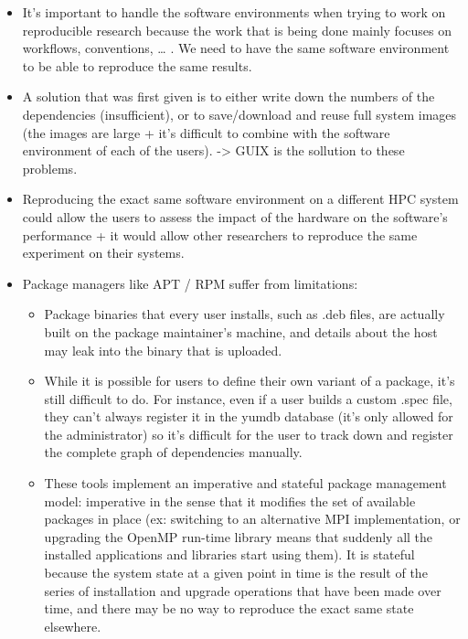\documentclass[11pt]{article}
\begin{document}
\begin{itemize}
\item It's important to handle the software environments when trying to
work on reproducible research because the work that is being done
mainly focuses on workflows, conventions, \ldots{} . We need to have
the same  software environment to be able to reproduce the same results.
\item A solution that was first given is to either write down the
numbers of the dependencies (insufficient), or to save/download
and reuse full system images (the images are large + it's
difficult to combine with the software environment of each of
the users). -> GUIX is the sollution to these problems.
\item Reproducing the exact same software environment on a different HPC
system could allow the users to assess the impact of the hardware
on the software’s performance + it would allow other researchers
to reproduce the same experiment on their systems.
\item Package managers like APT / RPM suffer from limitations:
\begin{itemize}
\item Package binaries that every user installs, such as .deb
files, are actually built on the package maintainer’s
machine, and details about the host may leak into the
binary that is uploaded.
\item While it is possible for users to define their own variant
of a package, it's still difficult to do. For instance,
even if a user builds a custom .spec file, they can't always
register it in the yumdb database (it's only allowed for
the administrator) so it's difficult for the user to track
down and register the complete graph of dependencies manually.
\item These tools implement an imperative and stateful package
management model: imperative in the sense that it modifies
the set of available packages in place (ex: switching to an
alternative MPI implementation, or upgrading the OpenMP
run-time library means that suddenly all the installed
applications and libraries start using them). It is stateful
because the system state at a given point in time is the
result of the series of installation and upgrade operations
that have been made over time, and there may be no way to
reproduce the exact same state elsewhere.
\end{itemize}


\end{itemize}
\end{document}

